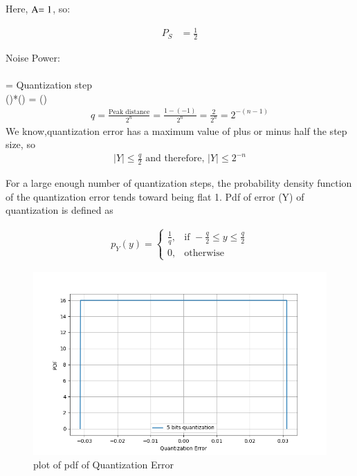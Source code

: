 \documentclass[journal,12pt,onecolumn]{IEEEtran}
\begin{document}
Here, \($A$ = 1\), so:

\begin{align}
P_S &= \frac{1}{2}
\end{align}
\item Noise Power:\\
\\
 = Quantization step \\
()*() =    ()\\
\begin{align}
q = \frac{\text{Peak distance}}{2^{n}} = \frac{1-(-1)}{2^{n}} = \frac{2}{2^{n}} = 2^{-(n-1)} \label{eq:gate:1}
\end{align}
\label{fig:Gate.31.2023.1}
We know,quantization error has a maximum value of plus or minus half the
step size, so 
\begin{align}
\left| Y \right| \leq \frac{q}{2} \text{ and therefore, } \left| Y \right| \leq 2^{-n}
\end{align}

For a large enough number of quantization steps, the probability density function of the quantization error tends toward being flat 1.
Pdf of error (Y) of quantization is defined as 

\begin{align}
p_Y(y) = 
\begin{cases}
    \frac{1}{q}, & \text{if } -\frac{q}{2} \leq y \leq \frac{q}{2} \\
    0, & \text{otherwise}
\end{cases}
\end{align}
\begin{figure}[H]
  \centering
  \includegraphics[width=0.7\columnwidth]{Graph/b.png}
  \caption{plot of pdf of Quantization Error}
  \label{fig:Gate.31.2023.2}
\end{figure}
\end{document}

